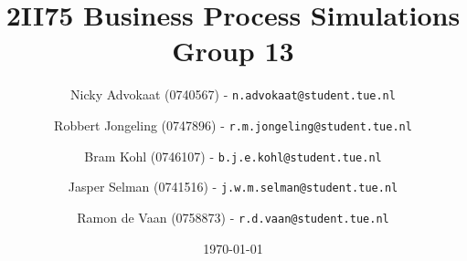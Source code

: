 \documentclass[a4paper,11pt]{article}
\title{
	2II75 Business Process Simulations \\
	\small{Group 13}
}
\author{
	Nicky Advokaat (0740567) - \texttt{n.advokaat@student.tue.nl}
	\and
	Robbert Jongeling (0747896) - \texttt{r.m.jongeling@student.tue.nl}
	\and
	Bram Kohl (0746107) - \texttt{b.j.e.kohl@student.tue.nl}
	\and
	Jasper Selman (0741516) - \texttt{j.w.m.selman@student.tue.nl}
	\and
	Ramon de Vaan (0758873) - \texttt{r.d.vaan@student.tue.nl}
}
\date{\today}
\begin{document}
	\maketitle
	
	
	
	
	
	
		
	\newpage
	\begin{appendix}
	
   	
	\end{appendix}
\end{document}
